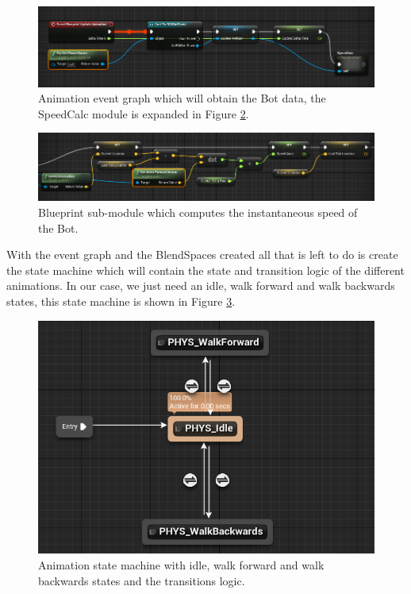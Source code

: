 \begin{figure}[h]
	\includegraphics[width=\textwidth]{archivos/animation_event_graph.png}
	\centering
	\caption{Animation event graph which will obtain the Bot data, the SpeedCalc module is expanded in Figure \ref{fig:speed_calc}.}
	\label{fig:event_graph}
\end{figure}

\begin{figure}[h]
	\includegraphics[width=\textwidth]{archivos/speed_calc.png}
	\centering
	\caption{Blueprint sub-module which computes the instantaneous speed of the Bot.}
	\label{fig:speed_calc}
\end{figure}

With the event graph and the BlendSpaces created all that is left to do is create the state machine which will contain the state and transition logic of the different animations. In our case, we just need an idle, walk forward and walk backwards states, this state machine is shown in Figure \ref{fig:state_machine}.

\begin{figure}[h]
	\includegraphics[scale=0.6]{archivos/animation_state_machine.png}
	\centering
	\caption{Animation state machine with idle, walk forward and walk backwards states and the transitions logic.}
	\label{fig:state_machine}
\end{figure}

